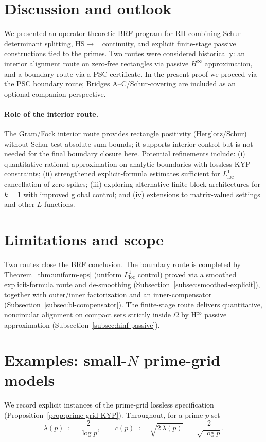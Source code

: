 \documentclass[11pt]{article}
\theoremstyle{definition}
\theoremstyle{remark}
\DeclareMathOperator{\dettwo}{det_2}
\begin{document}
\section{Discussion and outlook}\label{sec:discussion}
We presented an operator-theoretic BRF program for RH combining Schur--determinant splitting, HS\(\to\)\(\dettwo\) continuity, and explicit finite-stage passive constructions tied to the primes. Two routes were considered historically: an interior alignment route on zero-free rectangles via passive $H^\infty$ approximation, and a boundary route via a PSC certificate. In the present proof we proceed via the PSC boundary route; Bridges A--C/Schur-covering are included as an optional companion perspective.
\paragraph{Role of the interior route.}
The Gram/Fock interior route provides rectangle positivity (Herglotz/Schur) without Schur-test absolute-sum bounds; it supports interior control but is not needed for the final boundary closure here.
Potential refinements include: (i) quantitative rational approximation on analytic boundaries with lossless KYP constraints; (ii) strengthened explicit-formula estimates sufficient for $L^1_{\mathrm{loc}}$ cancellation of zero spikes; (iii) exploring alternative finite-block architectures for $k=1$ with improved global control; and (iv) extensions to matrix-valued settings and other $L$-functions.

\section{Limitations and scope}\label{sec:limitations}
Two routes close the BRF conclusion. The boundary route is completed by Theorem~\ref{thm:uniform-eps} (uniform $L^1_{\mathrm{loc}}$ control) proved via a smoothed explicit-formula route and de-smoothing (Subsection~\ref{subsec:smoothed-explicit}), together with outer/inner factorization and an inner-compensator (Subsection~\ref{subsec:bl-compensator}). The finite-stage route delivers quantitative, noncircular alignment on compact sets strictly inside \(\Omega\) by H$^\infty$ passive approximation (Subsection~\ref{subsec:hinf-passive}).

\section{Examples: small-$N$ prime-grid models}\label{sec:examples}
We record explicit instances of the prime-grid lossless specification (Proposition~\ref{prop:prime-grid-KYP}). Throughout, for a prime \(p\) set
\[
 \lambda(p)\;:=\;\frac{2}{\log p},\qquad c(p)\;:=\;\sqrt{2\,\lambda(p)}\;=\;\frac{2}{\sqrt{\log p}}.
\]
\end{document}
